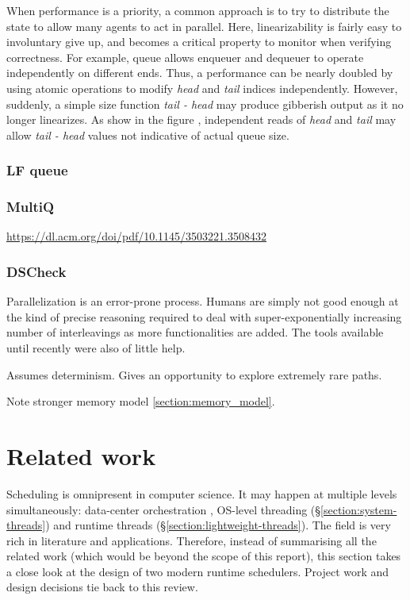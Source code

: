 \documentclass[12pt,a4paper,twoside]{report}
\begin{document}
When performance is a priority, a common approach is to try to distribute the state to allow many agents to act in parallel. Here, linearizability is fairly easy to involuntary give up, and becomes a critical property to monitor when verifying correctness. For example, queue allows enqueuer and dequeuer to operate independently on different ends. Thus, a performance can be nearly doubled by using atomic operations to modify \textit{head} and \textit{tail} indices independently. However, suddenly, a simple size function \textit{tail - head} may produce gibberish output as it no longer linearizes. As show in the figure , independent reads of \textit{head} and \textit{tail} may allow \textit{tail - head} values not indicative of actual queue size.

\subsection{LF queue}


\subsection{MultiQ}

\url{https://dl.acm.org/doi/pdf/10.1145/3503221.3508432}


\subsection{DSCheck}
Parallelization is an error-prone process. Humans are simply not good enough at the kind of precise reasoning required to deal with super-exponentially increasing number of interleavings as more functionalities are added. The tools available until recently were also of little help. 

Assumes determinism. Gives an opportunity to explore extremely rare paths.

Note stronger memory model \ref{section:memory_model}.


\chapter{Related work}

Scheduling is omnipresent in computer science. It may happen at multiple levels simultaneously: data-center orchestration \cite{NomadbyH95:online}, OS-level threading (\S\ref{section:system-threads}) and runtime threads (\S\ref{section:lightweight-threads}). The field is very rich in literature and applications. Therefore, instead of summarising all the related work (which would be beyond the scope of this report), this section takes a close look at the design of two modern runtime schedulers. Project work and design decisions tie back to this review. 
\end{document}
